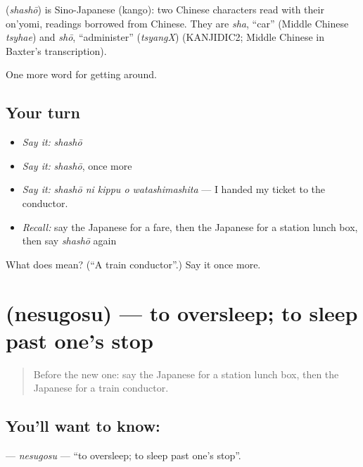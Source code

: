 \begin{cousinweb}
\textbf{} (\emph{shashō}) is Sino-Japanese (kango): two Chinese characters read with their on'yomi, readings borrowed from Chinese. They are \emph{sha}, \textquotedblleft{}car\textquotedblright{} (Middle Chinese \emph{tsyhae}) and \emph{shō}, \textquotedblleft{}administer\textquotedblright{} (\emph{tsyangX}) (KANJIDIC2; Middle Chinese in Baxter's transcription).
\end{cousinweb}

\begin{grammarlens}[title={What you've built}]
One more word for getting around.
\end{grammarlens}

\subsection*{Your turn}
\begin{itemize}
\raggedright
  \item \emph{Say it:} \emph{shashō}
  \item \emph{Say it:} \emph{shashō}, once more
  \item \emph{Say it:} \emph{shashō ni kippu o watashimashita} — I handed my ticket to the conductor.
  \item \emph{Recall:} say the Japanese for a fare, then the Japanese for a station lunch box, then say \emph{shashō} again
\end{itemize}

\begin{tcolorbox}[breakable,colback=teal!4,colframe=teal!35!black,title={Before you move on}]
What does  mean? (\textquotedblleft{}A train conductor\textquotedblright{}.) Say it once more.
\end{tcolorbox}
\section[\texorpdfstring{\ja{ねすごす} (nesugosu)}{ねすごす (nesugosu)}]{ (nesugosu) — to oversleep; to sleep past one's stop}

\label{lesson:JA-C380-nesugosu}



\begin{quote}
Before the new one: say the Japanese for a station lunch box, then the Japanese for a train conductor.
\end{quote}

\subsection*{You'll want to know: }
\textbf{} — \emph{nesugosu} — \textquotedblleft{}to oversleep; to sleep past one's stop\textquotedblright{}.

